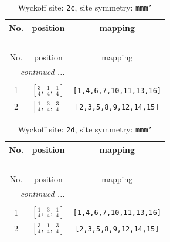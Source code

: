 \documentclass[fleqn,8pt]{jsarticle}
\begin{document}
\renewcommand{\arraystretch}{1.2}
\begin{longtable}{ccc}
\caption{Wyckoff site: {\tt 2c}, site symmetry: {\tt mmm'}}
 \\
 \hline \hline
No. & position & mapping \\ \hline \endfirsthead

\multicolumn{2}{l}{\tablename\ \thetable{}} \\
 \hline \hline
No. & position & mapping \\ \hline \endhead

 \hline \hline
\multicolumn{2}{r}{\footnotesize\it continued ...} \\ \endfoot

 \hline \hline
\multicolumn{2}{r}{} \\ \endlastfoot

1 & $\left[ \frac{3}{4},\, \frac{1}{4},\, \frac{1}{4} \right]$ & {\tt [1,4,6,7,10,11,13,16]} \\ \hline
2 & $\left[ \frac{1}{4},\, \frac{3}{4},\, \frac{3}{4} \right]$ & {\tt [2,3,5,8,9,12,14,15]} \\
\end{longtable}
\renewcommand{\arraystretch}{1.2}
\begin{longtable}{ccc}
\caption{Wyckoff site: {\tt 2d}, site symmetry: {\tt mmm'}}
 \\
 \hline \hline
No. & position & mapping \\ \hline \endfirsthead

\multicolumn{2}{l}{\tablename\ \thetable{}} \\
 \hline \hline
No. & position & mapping \\ \hline \endhead

 \hline \hline
\multicolumn{2}{r}{\footnotesize\it continued ...} \\ \endfoot

 \hline \hline
\multicolumn{2}{r}{} \\ \endlastfoot

1 & $\left[ \frac{1}{4},\, \frac{3}{4},\, \frac{1}{4} \right]$ & {\tt [1,4,6,7,10,11,13,16]} \\ \hline
2 & $\left[ \frac{3}{4},\, \frac{1}{4},\, \frac{3}{4} \right]$ & {\tt [2,3,5,8,9,12,14,15]} \\
\end{longtable}
\renewcommand{\arraystretch}{1.2}
\end{document}
